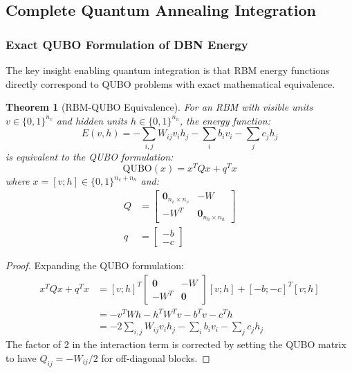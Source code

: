 \documentclass{article}
\newtheorem{theorem}{Theorem}
\begin{document}
\subsection{Complete Quantum Annealing Integration}

\subsubsection{Exact QUBO Formulation of DBN Energy}

The key insight enabling quantum integration is that RBM energy functions directly correspond to QUBO problems with exact mathematical equivalence.

\begin{theorem}[RBM-QUBO Equivalence]
For an RBM with visible units $v \in \{0,1\}^{n_v}$ and hidden units $h \in \{0,1\}^{n_h}$, the energy function:
\begin{equation}
E(v, h) = -\sum_{i,j} W_{ij} v_i h_j - \sum_i b_i v_i - \sum_j c_j h_j
\end{equation}
is equivalent to the QUBO formulation:
\begin{equation}
\text{QUBO}(x) = x^T Q x + q^T x
\end{equation}
where $x = [v; h] \in \{0,1\}^{n_v + n_h}$ and:
\begin{align}
Q &= \begin{bmatrix}
\mathbf{0}_{n_v \times n_v} & -W \\
-W^T & \mathbf{0}_{n_h \times n_h}
\end{bmatrix}\\
q &= \begin{bmatrix} -b \\ -c \end{bmatrix}
\end{align}
\end{theorem}

\begin{proof}
Expanding the QUBO formulation:
\begin{align}
x^T Q x + q^T x &= [v; h]^T \begin{bmatrix} \mathbf{0} & -W \\ -W^T & \mathbf{0} \end{bmatrix} [v; h] + [-b; -c]^T [v; h]\\
&= -v^T W h - h^T W^T v - b^T v - c^T h\\
&= -2 \sum_{i,j} W_{ij} v_i h_j - \sum_i b_i v_i - \sum_j c_j h_j
\end{align}
The factor of 2 in the interaction term is corrected by setting the QUBO matrix to have $Q_{ij} = -W_{ij}/2$ for off-diagonal blocks.
\end{proof}
\end{document}
